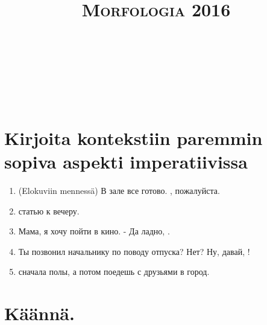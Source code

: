 \documentclass[paper=a4, fontsize=11pt]{scrartcl}
\title{	
\normalfont \normalsize 
\textsc{Morfologia 2016} \\ [25pt] 
\horrule{0.5pt} \\[0.4cm] 
\huge  \\ 
\horrule{2pt} \\[0.5cm] 
}
\date{}
\begin{document}
\onehalfspacing
\section{Kirjoita kontekstiin paremmin sopiva aspekti imperatiivissa} 

\begin{enumerate}
    \item (Elokuviin mennessä) В зале все готово. , пожалуйста.\\
    \underline{\hspace{12cm}}
    \item  {} статью к вечеру.\\
    \underline{\hspace{12cm}}
    \item Мама, я хочу пойти в кино. - Да ладно, . \\
    \underline{\hspace{12cm}}
    \item Ты позвонил начальнику по поводу отпуска? Нет? Ну, давай, ! \\
    \underline{\hspace{12cm}}
    \item {} сначала полы, а потом поедешь с друзьями в город.\\
    \underline{\hspace{12cm}}
\end{enumerate}

\section{Käännä.}
\end{document}
